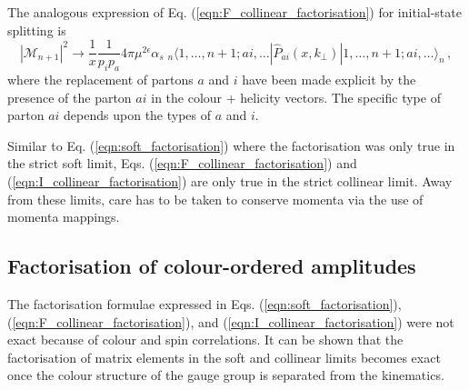 \documentclass[main.tex]{subfiles}
\begin{document}
    The analogous expression of Eq. (\ref{eqn:F_collinear_factorisation})
    for initial-state splitting is
    \begin{equation}\label{eqn:I_collinear_factorisation}
        |\mathcal{M}_{n+1}|^{2} \rightarrow \dfrac{1}{x} \dfrac{1}{p_{i}p_{a}} 4\pi \mu^{2\epsilon} \alpha_{s} \; {}_{n} \langle 1,\ldots,n+1;ai, \ldots | \hat{P}_{ai}(x, k_{\perp}) | 1,\ldots,n+1;ai,\ldots \rangle_{n} \, ,
    \end{equation}
    where the replacement of partons $a$ and $i$ have been made
    explicit by the presence of the parton $ai$ in the colour + helicity vectors.
    The specific type of parton $ai$ depends upon the types of $a$ and $i$.

    Similar to Eq. (\ref{eqn:soft_factorisation}) where the factorisation was
    only true in the strict soft limit, Eqs. (\ref{eqn:F_collinear_factorisation})
    and (\ref{eqn:I_collinear_factorisation}) are only
    true in the strict collinear limit. Away from these
    limits, care has to be taken to conserve momenta
    via the use of momenta mappings.

\subsection{Factorisation of colour-ordered amplitudes}\label{sec:CO_factorisation}
    The factorisation formulae expressed in Eqs. (\ref{eqn:soft_factorisation}),
    (\ref{eqn:F_collinear_factorisation}), and (\ref{eqn:I_collinear_factorisation})
    were not exact because of colour and spin correlations.
    It can be shown that the factorisation of matrix
    elements in the soft and collinear limits becomes
    exact once the colour structure of the gauge group
    is separated from the kinematics. 
\end{document}
